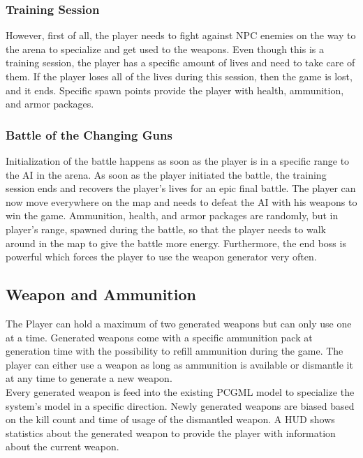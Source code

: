\documentclass[MGS,Master,english]{twbook}%
\begin{document}
\subsubsection{Training Session}
However, first of all, the player needs to fight against NPC enemies on the way to the arena to specialize and get used to the weapons. Even though this is a training session, the player has a specific amount of lives and need to take care of them. If the player loses all of the lives during this session, then the game is lost, and it ends. Specific spawn points provide the player with health, ammunition, and armor packages.

\subsubsection{Battle of the Changing Guns}
Initialization of the battle happens as soon as the player is in a specific range to the AI in the arena. As soon as the player initiated the battle, the training session ends and recovers the player's lives for an epic final battle. The player can now move everywhere on the map and needs to defeat the AI with his weapons to win the game. Ammunition, health, and armor packages are randomly, but in player's range, spawned during the battle, so that the player needs to walk around in the map to give the battle more energy. Furthermore, the end boss is powerful which forces the player to use the weapon generator very often. 

\subsection{Weapon and Ammunition}
The Player can hold a maximum of two generated weapons but can only use one at a time. Generated weapons come with a specific ammunition pack at generation time with the possibility to refill ammunition during the game. The player can either use a weapon as long as ammunition is available or dismantle it at any time to generate a new weapon.\\
Every generated weapon is feed into the existing PCGML model to specialize the system’s model in a specific direction. Newly generated weapons are biased based on the kill count and time of usage of the dismantled weapon. A \ac{HUD} shows statistics about the generated weapon to provide the player with information about the current weapon. 
\end{document}
